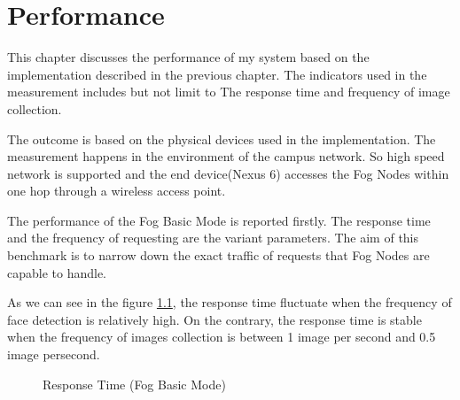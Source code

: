 \chapter{Performance} \label{chap:performance}
This chapter discusses the performance of my system based on the implementation described in the previous chapter. The indicators used in the measurement includes but not limit to The response time and frequency of image collection.

The outcome is based on the physical devices used in the implementation. The measurement happens in the environment of the campus network. So high speed network is supported and the end device(Nexus 6) accesses the Fog Nodes within one hop through a wireless access point.

The performance of the Fog Basic Mode is reported firstly. The response time and the frequency of requesting are the variant parameters. The aim of this benchmark is to narrow down the exact traffic of requests that Fog Nodes are capable to handle.

As we can see in the figure \ref{fig:response_time_fog_basic}, the response time fluctuate when the frequency of face detection is relatively high. On the contrary, the response time is stable when the frequency of images collection is between 1 image per second and 0.5 image persecond.


\begin{figure}
\centering
{}
\caption{Response Time (Fog Basic Mode)}
\label{fig:response_time_fog_basic}
\end{figure}

